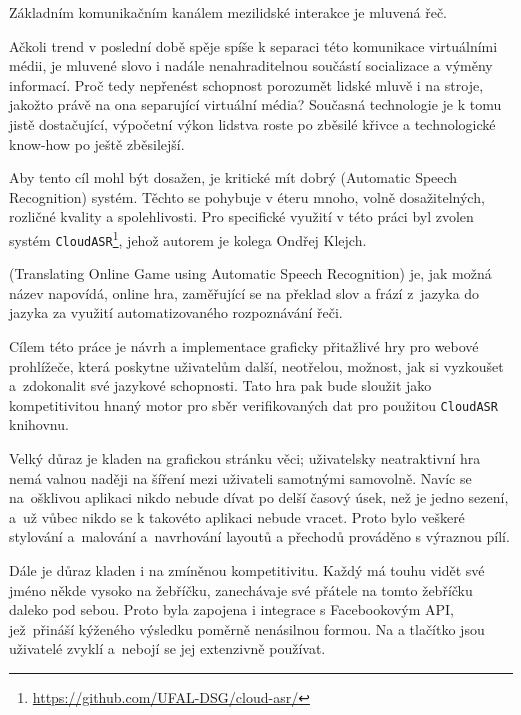 
Základním komunikačním kanálem mezilidské interakce je mluvená řeč. 

Ačkoli trend v poslední době spěje spíše k separaci této komunikace virtuálními médii, je mluvené slovo i nadále nenahraditelnou součástí socializace a výměny informací. Proč tedy nepřenést schopnost porozumět lidské mluvě i na stroje, jakožto právě na ona separující virtuální média? Současná technologie je k tomu jistě dostačující, výpočetní výkon lidstva roste po zběsilé křivce a technologické know-how po ještě zběsilejší.

Aby tento cíl mohl být dosažen, je kritické mít dobrý  (Automatic Speech Recognition) systém. Těchto se pohybuje v éteru mnoho, volně dosažitelných, rozličné kvality a spolehlivosti. Pro specifické využití v této práci byl zvolen systém 
\verb|CloudASR|\footnote{\url{https://github.com/UFAL-DSG/cloud-asr/}}, jehož autorem je kolega Ondřej Klejch.

\texttt{} (Translating Online Game using Automatic Speech Recognition) je, jak možná název napovídá, online hra, zaměřující se na překlad slov a frází z~jazyka do jazyka za využití automatizovaného rozpoznávání řeči.

Cílem této práce je návrh a implementace graficky přitažlivé hry pro webové prohlížeče, která poskytne uživatelům další, neotřelou, možnost, jak si vyzkoušet a~zdokonalit své jazykové schopnosti. Tato hra pak bude sloužit jako kompetitivitou hnaný motor pro sběr verifikovaných dat pro použitou \verb|CloudASR| knihovnu.

Velký důraz je kladen na grafickou stránku věci; uživatelsky neatraktivní hra nemá valnou naději na šíření mezi uživateli samotnými samovolně. Navíc se na~ošklivou aplikaci nikdo nebude dívat po delší časový úsek, než je jedno sezení, a~už vůbec nikdo se k takovéto aplikaci nebude vracet. Proto bylo veškeré stylování a~malování a~navrhování layoutů a přechodů prováděno s výraznou pílí.

Dále je důraz kladen i na zmíněnou kompetitivitu. Každý má touhu vidět své jméno někde vysoko na žebříčku, zanechávaje své přátele na tomto žebříčku daleko pod sebou. Proto byla zapojena i integrace s Facebookovým API, jež~přináší kýženého výsledku poměrně nenásilnou formou. Na  a  tlačítko jsou uživatelé zvyklí a~nebojí se jej extenzivně používat.

